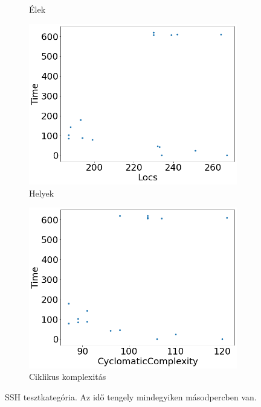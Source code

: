 \begin{figure}[ht]
\begin{subfigure}[b]{0.5\linewidth}
		\caption{Élek} 
		\label{fig7:b} 
		\vspace{4ex}
	\end{subfigure} 
	\begin{subfigure}[b]{0.5\linewidth}
		\centering
		\includegraphics[width=0.95\linewidth]{figures/ssh/locs.png} 
		\caption{Helyek} 
		\label{fig7:c} 
	\end{subfigure}%
	\begin{subfigure}[b]{0.5\linewidth}
		\centering
		\includegraphics[width=0.95\linewidth]{figures/ssh/cc.png} 
		\caption{Ciklikus komplexitás} 
		\label{fig7:d} 
	\end{subfigure} 
	\caption{SSH tesztkategória. Az idő tengely mindegyiken másodpercben van.}
	\label{fig_ssh} 
\end{figure}

